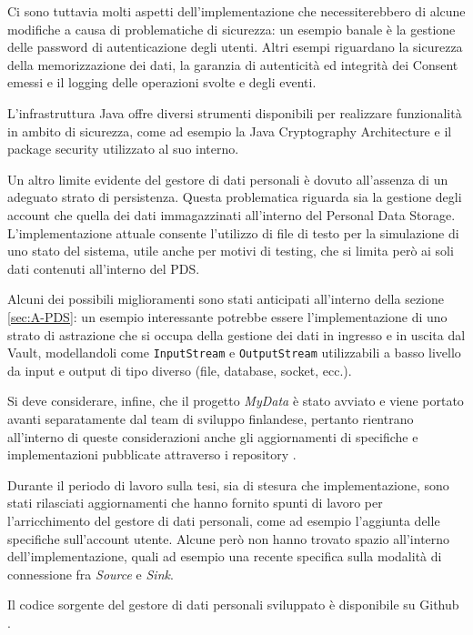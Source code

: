 Ci sono tuttavia molti aspetti dell’implementazione che necessiterebbero di alcune modifiche a causa di problematiche di sicurezza: un esempio banale \`e la gestione delle password di autenticazione degli utenti. Altri esempi riguardano la sicurezza della memorizzazione dei dati, la garanzia di autenticit\`a ed integrit\`a dei Consent emessi e il logging delle operazioni svolte e degli eventi.

L’infrastruttura Java offre diversi strumenti disponibili per realizzare funzionalit\`a in ambito di sicurezza, come ad esempio la Java Cryptography Architecture e il package security utilizzato al suo interno.

Un altro limite evidente del gestore di dati personali \`e dovuto all’assenza di un adeguato strato di persistenza. Questa problematica riguarda sia la gestione degli account che quella dei dati immagazzinati all’interno del Personal Data Storage. L’implementazione attuale consente l’utilizzo di file di testo per la simulazione di uno stato del sistema, utile anche per motivi di testing, che si limita per\`o ai soli dati contenuti all’interno del PDS.

Alcuni dei possibili miglioramenti sono stati anticipati all’interno della sezione \ref{sec:A-PDS}: un esempio interessante potrebbe essere l’implementazione di uno strato di astrazione che si occupa della gestione dei dati in ingresso e in uscita dal Vault, modellandoli come \texttt{InputStream} e \texttt{OutputStream} utilizzabili a basso livello da input e output di tipo diverso (file, database, socket, ecc.).

Si deve considerare, infine, che il progetto \textit{MyData} \`e stato avviato e viene portato avanti separatamente dal team di sviluppo finlandese, pertanto rientrano all’interno di queste considerazioni anche gli aggiornamenti di specifiche e implementazioni pubblicate attraverso i repository \cite{githubmydatastack} \cite{githubmobilityprofile} \cite{githubjourneyplanner} \cite{githubmydatasdk}.

Durante il periodo di lavoro sulla tesi, sia di stesura che implementazione, sono stati rilasciati aggiornamenti che hanno fornito spunti di lavoro per l’arricchimento del gestore di dati personali, come ad esempio l’aggiunta delle specifiche sull’account utente. Alcune per\`o non hanno trovato spazio all’interno dell’implementazione, quali ad esempio una recente specifica sulla modalit\`a di connessione fra \textit{Source} e \textit{Sink}.

Il codice sorgente del gestore di dati personali sviluppato \`e disponibile su Github \cite{githubthesis}.